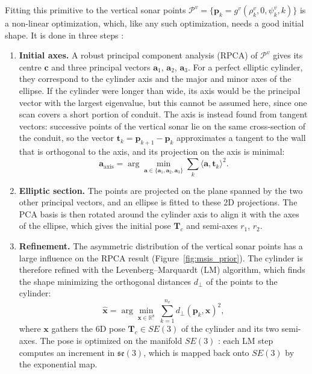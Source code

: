 Fitting this primitive to the vertical sonar points
$\mathcal{P}^v = \{\mathbf{p}_k = g^v(\rho^v_k, 0, \psi^v_k, k)\}$ is a non-linear optimization,
which, like any such optimization, needs a good initial shape. It is done in three steps
\citep{breux2020elevation}:
\begin{enumerate}                        %
  \item \textbf{Initial axes.} A robust principal component analysis (RPCA) of $\mathcal{P}^v$ gives
        its centre $\mathbf{c}$ and three principal vectors $\mathbf{a}_1$, $\mathbf{a}_2$,
        $\mathbf{a}_3$. For a perfect elliptic cylinder, they correspond to the cylinder axis and the
        major and minor axes of the ellipse. If the cylinder were longer than wide, its axis would be
        the principal vector with the largest eigenvalue, but this cannot be assumed here, since one
        scan covers a short portion of conduit. The axis is instead found from tangent vectors:
        successive points of the vertical sonar lie on the same cross-section of the conduit, so the
        vector $\mathbf{t}_k = \mathbf{p}_{k+1} - \mathbf{p}_k$ approximates a tangent to the wall that
        is orthogonal to the axis, and its projection on the axis is minimal:
        \begin{equation}                 %
          \mathbf{a}_{\mathrm{axis}} = \arg\min_{\mathbf{a} \in \{\mathbf{a}_1, \mathbf{a}_2, \mathbf{a}_3\}}
          \sum_{k} \langle \mathbf{a}, \mathbf{t}_k \rangle^2.
          \label{eq:msis_axis_pca}
        \end{equation}
  \item \textbf{Elliptic section.} The points are projected on the plane spanned by the two other
        principal vectors, and an ellipse is fitted to these 2D projections. The PCA basis is then
        rotated around the cylinder axis to align it with the axes of the ellipse, which gives the
        initial pose $\mathbf{T}_c$ and semi-axes $r_1$, $r_2$.
  \item \textbf{Refinement.} The asymmetric distribution of the vertical sonar points has a large
        influence on the RPCA result (Figure~\ref{fig:msis_prior}). The cylinder is therefore refined
        with the Levenberg--Marquardt (LM) algorithm, which finds the shape minimizing the orthogonal
        distances $d_\perp$ of the points to the cylinder:
        \begin{equation}                 %
          \hat{\mathbf{x}} = \arg\min_{\mathbf{x} \in \mathbb{R}^8}\ \sum_{k=1}^{n_v} d_\perp(\mathbf{p}_k, \mathbf{x})^2,
          \label{eq:msis_lm}
        \end{equation}
        where $\mathbf{x}$ gathers the 6D pose $\mathbf{T}_c \in SE(3)$ of the cylinder and its two
        semi-axes. The pose is optimized on the manifold $SE(3)$ \citep{blanco2010tutorial}: each LM
        step computes an increment in $\mathfrak{se}(3)$, which is mapped back onto $SE(3)$ by the
        exponential map.
\end{enumerate}

